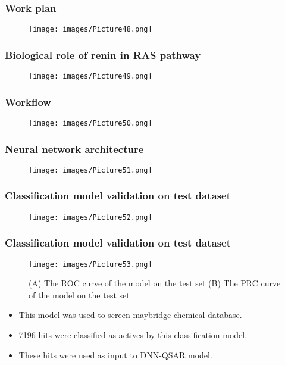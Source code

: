 \documentclass{beamer}
\begin{document}
\begin{frame}
\frametitle{\textbf{Work plan}}
\begin{figure}
\texttt{[image: images/Picture48.png]}
\end{figure}
\end{frame}

\begin{frame}
\frametitle{\textbf{Biological role of renin in RAS pathway}}
\begin{figure}
\texttt{[image: images/Picture49.png]}
\end{figure}
\end{frame}

\begin{frame}
\frametitle{\textbf{Workflow}}
\begin{figure}
\texttt{[image: images/Picture50.png]}
\end{figure}
\end{frame}

\begin{frame}
\frametitle{\textbf{Neural network architecture}}
\begin{figure}
\texttt{[image: images/Picture51.png]}
\end{figure}
\end{frame}

\begin{frame}
\frametitle{\textbf{Classification model validation on test dataset}}
\begin{figure}
\texttt{[image: images/Picture52.png]}
\end{figure}
\end{frame}

\begin{frame}
\frametitle{\textbf{Classification model validation on test dataset}}
\begin{figure}
\texttt{[image: images/Picture53.png]}
\caption{(A) The ROC curve of the model on the test set (B) The PRC curve of the model on the test set}
\end{figure}
\begin{itemize}
\item This model was used to screen maybridge chemical database.
\item 7196 hits were classified as actives by this classification model.
\item These hits were used as input to DNN-QSAR model.
\end{itemize}
\end{frame}
\end{document}
